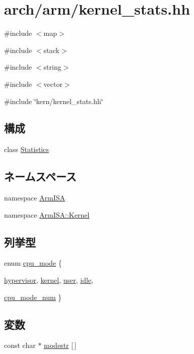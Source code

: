 \hypertarget{arch_2arm_2kernel__stats_8hh}{
\section{arch/arm/kernel\_\-stats.hh}
\label{arch_2arm_2kernel__stats_8hh}
}
{\ttfamily \#include $<$map$>$}\par
{\ttfamily \#include $<$stack$>$}\par
{\ttfamily \#include $<$string$>$}\par
{\ttfamily \#include $<$vector$>$}\par
{\ttfamily \#include \char`\"{}kern/kernel\_\-stats.hh\char`\"{}}\par
\subsection*{構成}
\begin{DoxyCompactItemize}
\item 
class \hyperlink{classArmISA_1_1Kernel_1_1Statistics}{Statistics}
\end{DoxyCompactItemize}
\subsection*{ネームスペース}
\begin{DoxyCompactItemize}
\item 
namespace \hyperlink{namespaceArmISA}{ArmISA}
\item 
namespace \hyperlink{namespaceArmISA_1_1Kernel}{ArmISA::Kernel}
\end{DoxyCompactItemize}
\subsection*{列挙型}
\begin{DoxyCompactItemize}
\item 
enum \hyperlink{namespaceArmISA_1_1Kernel_aa1fc3805dac6f71f457fbbc263105bf6}{cpu\_\-mode} \{ \par
\hyperlink{namespaceArmISA_1_1Kernel_aa1fc3805dac6f71f457fbbc263105bf6a91b640fcbd5e0f6c8310b554caa00d4b}{hypervisor}, 
\hyperlink{namespaceArmISA_1_1Kernel_aa1fc3805dac6f71f457fbbc263105bf6adb0339d028e596254368234e5ab09f9d}{kernel}, 
\hyperlink{namespaceArmISA_1_1Kernel_aa1fc3805dac6f71f457fbbc263105bf6a04981b8c09a50ccfb1d92fc11b81c36a}{user}, 
\hyperlink{namespaceArmISA_1_1Kernel_aa1fc3805dac6f71f457fbbc263105bf6a0e9a37114c0e458d28d52f06ec0f2242}{idle}, 
\par
\hyperlink{namespaceArmISA_1_1Kernel_aa1fc3805dac6f71f457fbbc263105bf6a4572f7cf10830e04921c8896f22102ba}{cpu\_\-mode\_\-num}
 \}
\end{DoxyCompactItemize}
\subsection*{変数}
\begin{DoxyCompactItemize}
\item 
const char $\ast$ \hyperlink{namespaceArmISA_1_1Kernel_aaab5092bc6d1c40a90ff4c7450649ace}{modestr} \mbox{[}$\,$\mbox{]}
\end{DoxyCompactItemize}
